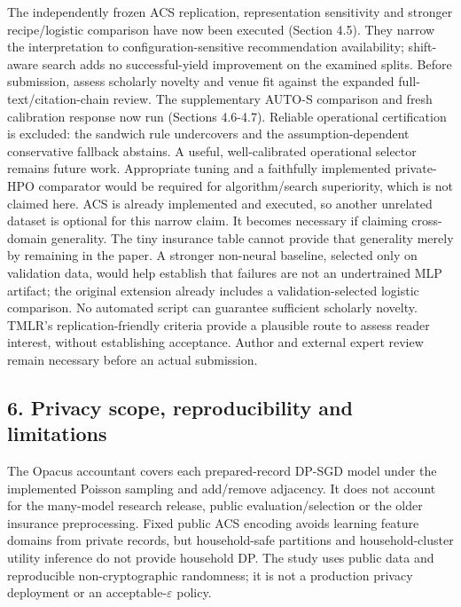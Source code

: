 \documentclass[
  10pt,
]{article}
\begin{document}
The independently frozen ACS replication, representation sensitivity and
stronger recipe/logistic comparison have now been executed (Section
4.5). They narrow the interpretation to configuration-sensitive
recommendation availability; shift-aware search adds no successful-yield
improvement on the examined splits. Before submission, assess scholarly
novelty and venue fit against the expanded full-text/citation-chain
review. The supplementary AUTO-S comparison and fresh calibration
response now run (Sections 4.6-4.7). Reliable operational certification
is excluded: the sandwich rule undercovers and the assumption-dependent
conservative fallback abstains. A useful, well-calibrated operational
selector remains future work. Appropriate tuning and a faithfully
implemented private-HPO comparator would be required for
algorithm/search superiority, which is not claimed here. ACS is already
implemented and executed, so another unrelated dataset is optional for
this narrow claim. It becomes necessary if claiming cross-domain
generality. The tiny insurance table cannot provide that generality
merely by remaining in the paper. A stronger non-neural baseline,
selected only on validation data, would help establish that failures are
not an undertrained MLP artifact; the original extension already
includes a validation-selected logistic comparison. No automated script
can guarantee sufficient scholarly novelty. TMLR's replication-friendly
criteria provide a plausible route to assess reader interest, without
establishing acceptance. Author and external expert review remain
necessary before an actual submission.

\hypertarget{privacy-scope-reproducibility-and-limitations}{%
\subsection{6. Privacy scope, reproducibility and
limitations}\label{privacy-scope-reproducibility-and-limitations}}

The Opacus accountant covers each prepared-record DP-SGD model under the
implemented Poisson sampling and add/remove adjacency. It does not
account for the many-model research release, public evaluation/selection
or the older insurance preprocessing. Fixed public ACS encoding avoids
learning feature domains from private records, but household-safe
partitions and household-cluster utility inference do not provide
household DP. The study uses public data and reproducible
non-cryptographic randomness; it is not a production privacy deployment
or an acceptable-\(\varepsilon\) policy.
\end{document}
